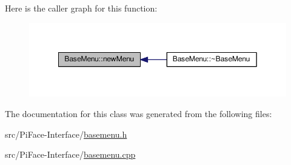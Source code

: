 Here is the caller graph for this function\+:
\nopagebreak
\begin{figure}[H]
\begin{center}
\leavevmode
\includegraphics[width=349pt]{classBaseMenu_a722bb88987e9a64015c59f3419d89704_icgraph}
\end{center}
\end{figure}




The documentation for this class was generated from the following files\+:\begin{DoxyCompactItemize}
\item 
src/\+Pi\+Face-\/\+Interface/\hyperlink{basemenu_8h}{basemenu.\+h}\item 
src/\+Pi\+Face-\/\+Interface/\hyperlink{basemenu_8cpp}{basemenu.\+cpp}\end{DoxyCompactItemize}
